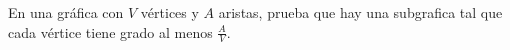 \begin{problem}
    En una gr\'afica con $V$ v\'ertices y $A$ aristas, prueba que hay una subgrafica tal que cada v\'ertice
    tiene grado al menos $\frac AV$.
    \label{24EN484}
\end{problem}